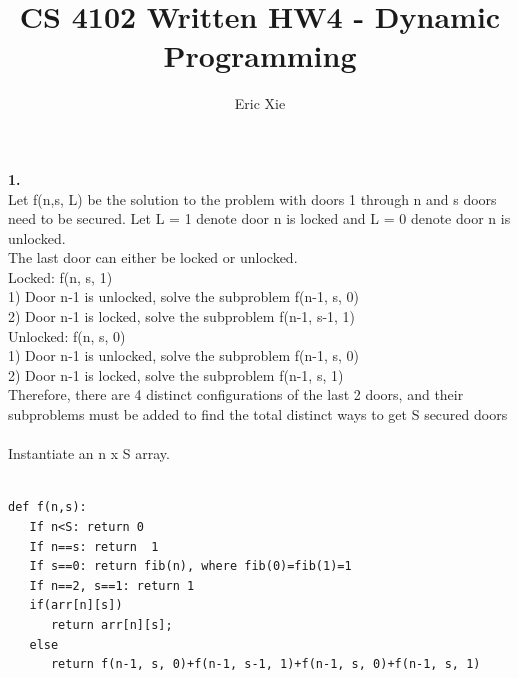 \documentclass[a4paper,12pt]{article}
\title{CS 4102 Written HW4 - Dynamic Programming}
\author{Eric Xie}
\begin{document}
\maketitle
\noindent \textbf{1.} \\
Let f(n,s, L) be the solution to the problem with doors 1 through n and s doors need to be secured. Let L = 1 denote door n is locked and L = 0 denote door n is unlocked.\\
The last door can either be locked or unlocked. \\
Locked: f(n, s, 1)\\
1) Door n-1 is unlocked, solve the subproblem f(n-1, s, 0)\\
2) Door n-1 is locked, solve the subproblem f(n-1, s-1, 1)\\
Unlocked: f(n, s, 0)\\
1) Door n-1 is unlocked, solve the subproblem f(n-1, s, 0)\\
2) Door n-1 is locked, solve the subproblem f(n-1, s, 1)\\
Therefore, there are 4 distinct configurations of the last 2 doors, and their subproblems must be added to find the total distinct ways to get S secured doors\\\\
Instantiate an n x S array. \\\\
\begin{lstlisting}
def f(n,s):
   If n<S: return 0 
   If n==s: return  1
   If s==0: return fib(n), where fib(0)=fib(1)=1
   If n==2, s==1: return 1
   if(arr[n][s])
      return arr[n][s];
   else
      return f(n-1, s, 0)+f(n-1, s-1, 1)+f(n-1, s, 0)+f(n-1, s, 1)
\end{lstlisting}
\end{document}
